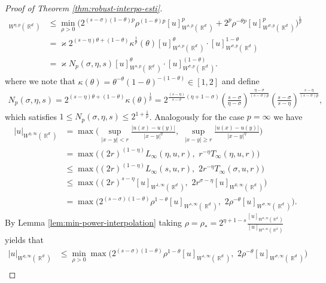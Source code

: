 \documentclass[12pt, reqno]{amsart}%
\theoremstyle{plain}  %
\theoremstyle{definition}  %
\theoremstyle{remark}
\numberwithin{equation}{section}
\DeclareMathOperator{\R}{\mathbb{R}}
\begin{document}
\begin{proof}[Proof of Theorem \ref{thm:robust-interpo-esti}]
\begin{align*}
[u]_{W^{\eta,p}(\R^d)}
&\leq	\min_{\rho>0}\Big(2^{(s-\sigma)(1-\theta)p} \rho^{(1-\theta)p }  [u]^p_{W^{s,p}(\R^d)}+ 2^p\rho^{-\theta p }  [u]^p_{W^{\sigma,p}(\R^d)}\Big)^{\frac{1}{p}} \\
&= \varkappa 2^{(s-\eta)\theta+(1-\theta)}\kappa^{\frac{1}{p}}(\theta) [u]_{W^{s,p} (\R^d)}^{\theta } \cdot
[u]_{W^{\sigma,p} (\R^d)}^{1 - \theta}\\
&=\varkappa N_p(\sigma, \eta, s) [u]_{W^{s,p} (\R^d)}^{\theta } \cdot
[u]_{W^{\sigma,p} (\R^d)}^{(1 - \theta)}.
\end{align*}
where we note that  $\kappa(\theta)=\theta^{-\theta}(1-\theta)^{-(1-\theta)}\in [1,2]$ and define
\begin{align*}
N_p(\sigma,\eta,s)
=2^{(s-\eta)\theta+(1-\theta)}
\kappa(\theta)^{\frac{1}{p}}
= 2^{\frac{(s-\eta)}{s-\sigma}(\eta+1-\sigma)}
\left(\frac{s-\sigma}{\eta-\sigma}\right)^{\frac{\eta-\sigma}{(s-\sigma)p}}
\left(\frac{s-\sigma}{s-\eta}\right)^{\frac{s-\eta}{(s-\sigma)p}},
\end{align*}
which satisfies   $1\leq N_p(\sigma, \eta, s)\leq 2^{1+\frac{1}{p}}$.  Analogously for the case $p=\infty$ we have
\begin{align*}
|u|_{W^{\eta,\infty}(\R^d)} &=
\max\Big(\sup_{|x-y|< r}\frac{| u(x)-u(y)|}{|x-y|^\eta}, \,\,  \sup_{|x-y|\geq r}\frac{| u(x)-u(y)|}{|x-y|^\eta}\Big)\\
&= \max \Big((2r)^{(1-\eta)}  L_\infty(\eta, u,r) ,\,\,   r^{-\eta} T_\infty(\eta, u,r)\Big) \\
&\leq  \max\Big((2r)^{(1-\eta)}  L_\infty(s, u,r) ,  \,\, 2r^{-\eta} T_\infty(\sigma, u,r)\Big) \\
&\leq \max \Big((2r)^{s-\eta}[u]_{W^{1,\infty}(\R^d)}, \,\,  2r^{\sigma-\eta}[u]_{W^{0,\infty}(\R^d)}\Big)\\
&=\max\Big(2^{(s-\sigma)(1-\theta)} \rho^{1-\theta}  [u]_{W^{s,\infty}(\R^d)}, \,\, 2\rho^{-\theta }  [u]_{W^{\sigma,\infty}(\R^d)}\Big).
\end{align*}
By Lemma \ref{lem:min-power-interpolation} taking $
\rho= \rho_*= 2^{\eta+ 1-s}\frac{ [u]_{W^{\sigma,\infty}(\R^d)}}{ [u]_{W^{s,\infty}(\R^d)}}$
yields that
\begin{align*}
|u|_{W^{\eta,\infty}(\R^d)}
&\leq \min_{\rho>0} \max\Big(2^{(s-\sigma)(1-\theta)} \rho^{1-\theta}  [u]_{W^{s,\infty}(\R^d)}, \,\, 2\rho^{-\theta }  [u]_{W^{\sigma,\infty}(\R^d)}\Big)\\

\end{align*}
\end{proof}
\end{document}
